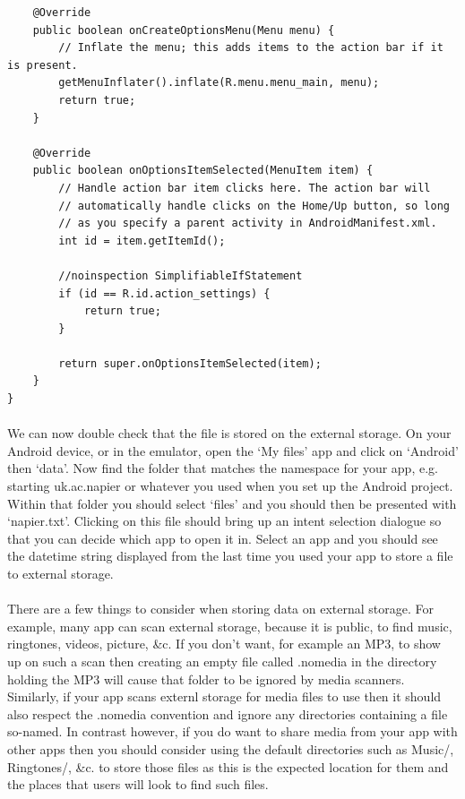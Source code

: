 \documentclass[12pt, a4paper, twoside]{book}
\begin{document}
\begin{lstlisting}
    @Override
    public boolean onCreateOptionsMenu(Menu menu) {
        // Inflate the menu; this adds items to the action bar if it is present.
        getMenuInflater().inflate(R.menu.menu_main, menu);
        return true;
    }

    @Override
    public boolean onOptionsItemSelected(MenuItem item) {
        // Handle action bar item clicks here. The action bar will
        // automatically handle clicks on the Home/Up button, so long
        // as you specify a parent activity in AndroidManifest.xml.
        int id = item.getItemId();

        //noinspection SimplifiableIfStatement
        if (id == R.id.action_settings) {
            return true;
        }

        return super.onOptionsItemSelected(item);
    }
}
\end{lstlisting}

\paragraph{} We can now double check that the file is stored on the external storage. On your Android device, or in the emulator, open the `My files' app and click on `Android' then `data'. Now find the folder that matches the namespace for your app, e.g. starting uk.ac.napier or whatever you used when you set up the Android project. Within that folder you should select `files' and you should then be presented with `napier.txt'. Clicking on this file should bring up an intent selection dialogue so that you can decide which app to open it in. Select an app and you should see the datetime string displayed from the last time you used your app to store a file to external storage.

\paragraph{} There are a few things to consider when storing data on external storage. For example, many app can scan external storage, because it is public, to find music, ringtones, videos, picture, \&c. If you don't want, for example an MP3, to show up on such a scan then creating an empty file called .nomedia in the directory holding the MP3 will cause that folder to be ignored by media scanners. Similarly, if your app scans externl storage for media files to use then it should also respect the .nomedia convention and ignore any directories containing a file so-named. In contrast however, if you do want to share media from your app with other apps then you should consider using the default directories such as Music/, Ringtones/, \&c. to store those files as this is the expected location for them and the places that users will look to find such files.
\end{document}
